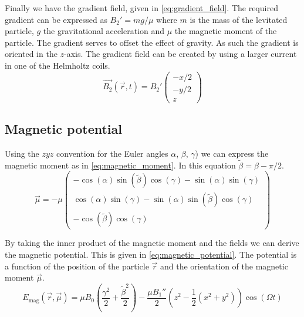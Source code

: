 Finally we have the gradient field, given in \autoref{eq:gradient_field}. The required gradient can be expressed as $B_2' = mg/\mu$ where $m$ is the mass of the levitated particle, $g$ the gravitational acceleration and $\mu$ the magnetic moment of the particle. The gradient serves to offset the effect of gravity. As such the gradient is oriented in the $z$-axis. The gradient field can be created by using a larger current in one of the Helmholtz coils.
\begin{equation}
    \vec{B_2}(\vec{r}, t) = B_2' \begin{pmatrix}
        -x / 2 \\
        -y / 2 \\
        z
    \end{pmatrix}
    \label{eq:gradient_field}
\end{equation}

\subsection{Magnetic potential}
\label{subsec:magnetic_moment}
Using the $zyz$ convention for the Euler angles $\alpha$, $\beta$, $\gamma$) we can express the magnetic moment as in \autoref{eq:magnetic_moment}. In this equation $\tilde\beta = \beta - \pi/2$.
\begin{equation}
    \vec{\mu} = -\mu \begin{pmatrix}
        -\cos(\alpha)\sin(\tilde\beta)\cos(\gamma) - \sin(\alpha)\sin(\gamma) \\
        \cos(\alpha)\sin(\gamma) - \sin(\alpha)\sin(\tilde\beta)\cos(\gamma) \\
        -\cos(\tilde\beta)\cos(\gamma)
    \end{pmatrix}
    \label{eq:magnetic_moment}
\end{equation}

By taking the inner product of the magnetic moment and the fields we can derive the magnetic potential. This is given in \autoref{eq:magnetic_potential}. The potential is a function of the position of the particle $\vec{r}$ and the orientation of the magnetic moment $\vec{\mu}$.
\begin{equation}
    E_\text{mag}(\vec{r}, \vec{\mu}) = \mu B_0 \left(\frac{\gamma^2}{2} + \frac{\tilde\beta^2}{2}\right) - \frac{\mu B_1''}{2} \left(z^2 - \frac{1}{2}\left(x^2 + y^2\right)\right)\cos(\Omega t)
    \label{eq:magnetic_potential}
\end{equation}

